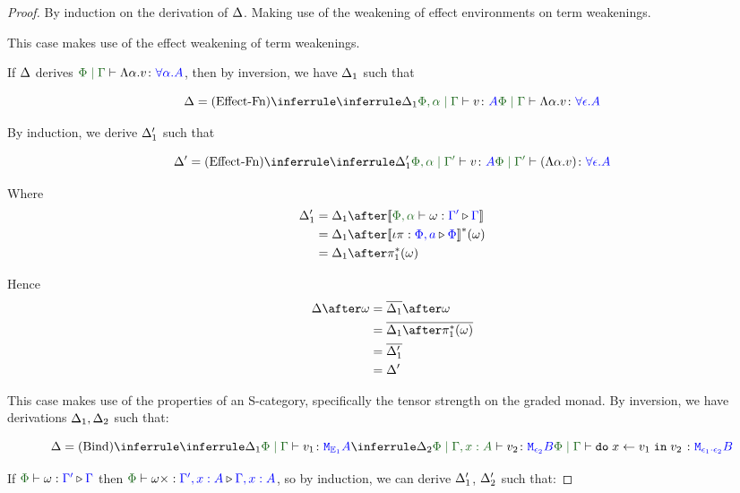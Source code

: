\documentclass{Report}
\begin{document}
\begin{proof}
    By induction on the derivation of $\Delta$. Making use of the weakening of effect environments on term weakenings.

This case makes use of the effect weakening of term weakenings.

If $\Delta$ derives $\gpetyperelation{\elam{\a}{v}}{\all{\a}{A}}$, then by inversion, we have $\Delta_1$ such that

\begin{equation}
    \D = \ntreeruleI{Effect-Fn}{\treeruleI{\D_1}{\etyperelation{\P,\a}{\G}{v}{A}}}{\gpetyperelation{\elam{\a}{v}}{\all{\e}{A}}}
\end{equation}

By induction, we derive $\Delta_1'$ such that

\begin{equation}
    \D' = \ntreeruleI{Effect-Fn}{\treeruleI{\D_1'}{\etyperelation{\P,\a}{\G'}{v}{A}}}{\etyperelation{\P}{\G'}{(\elam{\a}{v})}{\all{\e}{A}}}
\end{equation}

Where 
\begin{align*}
    \D_1' & = \D_1\after\deno{\ewrel{\P,\a}{\w}{\G'}{\G}}\\
    & = \D_1\after\deno{\wrel{\i\pi}{\P,a}{\P}}\star(\w)\\
    & = \D_1\after\pstar(\w)
\end{align*}

Hence \begin{align*}
    \D\after\w & = \bar{\D_1}\after\w\\
    & = \bar{\D_1\after\pstar(\w)}\\
    & = \bar{\D_1'}\\
    & = \D'
\end{align*}


This case makes use of the properties of an S-category, specifically the tensor strength on the graded monad. By inversion, we have derivations $\Delta_1, \Delta_2$ such that:


\begin{equation}
    \D = \ntreeruleII{Bind}{
        \treeruleI{\D_1}{\etyperelation{\P}{\G}{v_1}{\M{\E_1}{A}}}
    }{
        \treeruleI{\D_2}{\etyperelation{\P}{\G,x: A}{v_2}{\M{\e_2}{B}}}
    }{
        \etyperelation{\P}{\G}{\doin{x}{v_1}{v_2}}{\M{\e_1\dot\e_2}{B}}
    }
\end{equation}

If $\ewrel{\P}{\w}{\G'}{\G}$ then $\ewrel{\P}{\w\x}{\G',x:A}{\gax}$, so by induction, we can derive $\Delta_1'$, $\Delta_2'$ such that:


\end{proof}
\end{document}
